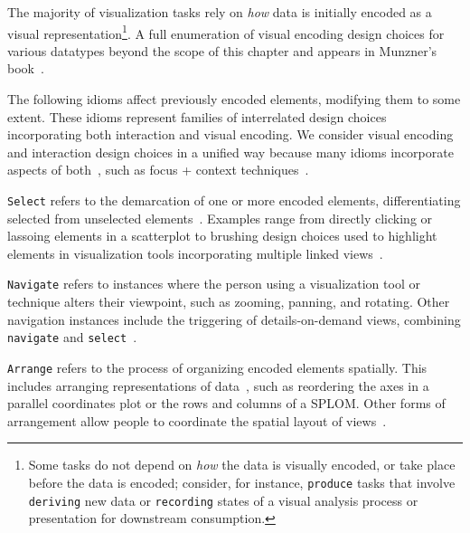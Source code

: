 The majority of visualization tasks rely on {\it how} data is initially encoded as a visual representation\footnote{Some tasks do not depend on {\it how} the data is visually encoded, or take place before the data is encoded; consider, for instance, {\tt produce} tasks that involve {\tt deriving} new data or {\tt recording} states of a visual analysis process or presentation for downstream consumption.}.
A full enumeration of visual encoding design choices for various datatypes beyond the scope of this chapter and appears in Munzner's book~\cite{Munzner2014}.

The following idioms affect previously encoded elements, modifying them to some extent.
These idioms represent families of interrelated design choices incorporating both interaction and visual encoding.
We consider visual encoding and interaction design choices in a unified way because many idioms incorporate aspects of both~\cite{Meyer2015,Munzner2009}, such as focus + context techniques~\cite{Grosjean2002,Munzner2003}.

{\tt Select}
refers to the demarcation of one or more encoded elements, differentiating selected from unselected elements~\cite{Raskin2000}.
Examples range from directly clicking or lassoing elements in a scatterplot to brushing design choices used to highlight elements in visualization tools incorporating multiple linked views~\cite{Weaver2007}.

{\tt Navigate}
refers to instances where the person using a visualization tool or technique alters their viewpoint, such as zooming, panning, and rotating.
Other navigation instances include the triggering of details-on-demand views, combining {\tt navigate} and {\tt select}~\cite{Shneiderman1996}.

{\tt Arrange}
refers to the process of organizing encoded elements spatially.
This includes arranging representations of data~\cite{Liu2010,Mullins1993,Wilkinson2005}, such as reordering the axes in a parallel coordinates plot or the rows and columns of a \ac{SPLOM}.
Other forms of arrangement allow people to coordinate the spatial layout of views~\cite{Heer2012,Weaver2007}.


